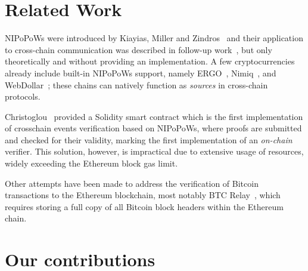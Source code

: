 \section{Related Work}

NIPoPoWs were introduced by Kiayias, Miller and Zindros~\cite{nipopows} and
their application to cross-chain communication was described in follow-up
work~\cite{pow-sidechains}, but only theoretically and without providing an
implementation. A few cryptocurrencies already include built-in NIPoPoWs
support, namely ERGO~\cite{ergo}, Nimiq~\cite{nimiq}, and
WebDollar~\cite{webdollar}; these chains can natively function as
\emph{sources} in cross-chain protocols.

Christoglou~\cite{gglou} provided a Solidity smart contract which is the first
implementation of crosschain events verification based on NIPoPoWs, where
proofs are submitted and checked for their validity, marking the first
implementation of an \emph{on-chain} verifier. This solution, however, is
impractical due to extensive usage of resources, widely exceeding the Ethereum
block gas limit.

Other attempts have been made to address the verification of
Bitcoin transactions to the Ethereum blockchain, most notably BTC
Relay~\cite{btcrelay}, which requires storing a full copy of all Bitcoin block
headers within the Ethereum chain.

\section{Our contributions}

